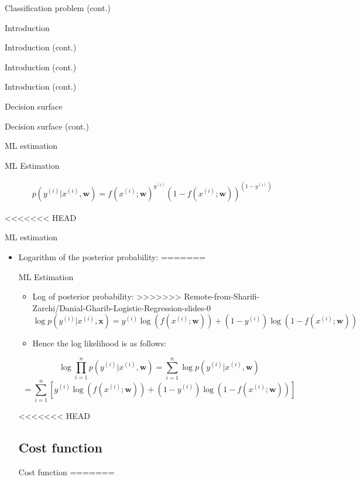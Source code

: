 \documentclass[serif, aspectratio=169]{beamer}
\begin{document}
\begin{frame}{Classification problem (cont.)}
\begin{itemize}
\begin{frame}{Introduction}
\begin{itemize}
\begin{frame}{Introduction (cont.)}
\begin{frame}{Introduction (cont.)}
\begin{frame}{Introduction (cont.)}
\begin{frame}{Decision surface}
\begin{itemize}
\begin{frame}{Decision surface (cont.)}
\begin{frame}{ML estimation}
\begin{frame}{ML Estimation}
\begin{itemize}
        \begin{align*}
            p(y^{(i)}|x^{(i)},\mathbf{w})=f(x^{(i)}; \mathbf{w})^{y^{(i)}} (1 - f(x^{(i)}; \mathbf{w}))^{(1 - y^{(i)})}
        \end{align*}
    \end{itemize}
\end{frame}
<<<<<<< HEAD
\begin{frame}{ML estimation}
    \begin{itemize}
        \item Logarithm of the posterior probability:
=======
\begin{frame}{ML Estimation}
    \begin{itemize}
        \item Log of posterior probability:
>>>>>>> Remote-from-Sharifi-Zarchi/Danial-Gharib-Logistic-Regression-slides-0
            \[
            \log p(y^{(i)}|x^{(i)}, \mathbf{x})=
            y^{(i)}\log (f(x^{(i)}; \mathbf{w})) + 
            (1-y^{(i)})\log (1 - f(x^{(i)}; \mathbf{w}))
            \]
        \item Hence the log likelihood is as follows:
    \end{itemize}
    \[
    \log \prod _{i=1}^{n} p(y^{(i)}|x^{(i)}, \mathbf{w}) = \sum  _{i=1}^{n} \log p(y^{(i)}|x^{(i)}, \mathbf{w})
    \]
    \[
    = \sum_{i=1}^{n}[y^{(i)}\log (f(x^{(i)}; \mathbf{w})) + 
    (1-y^{(i)})\log (1 - f(x^{(i)}; \mathbf{w}))]
    \]
\end{frame}


<<<<<<< HEAD
\subsection{Cost function}
\begin{frame}{Cost function}
=======

\end{frame}
\end{itemize}
\end{frame}
\end{frame}
\end{frame}
\end{itemize}
\end{frame}
\end{frame}
\end{frame}
\end{frame}
\end{itemize}
\end{frame}
\end{itemize}
\end{frame}
\end{document}
